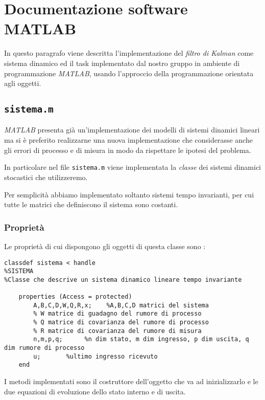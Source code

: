 \section{Documentazione software MATLAB}
In questo paragrafo viene descritta l'implementazione del \textit{filtro di Kalman} come sistema dinamico ed il task implementato dal nostro gruppo in ambiente di programmazione \textit{MATLAB}, usando l'approccio della programmazione orientata agli oggetti.

\subsection{\texttt{sistema.m}}
\textit{MATLAB} presenta già un'implementazione dei modelli di sistemi dinamici lineari ma si è preferito realizzarne una nuova implementazione che considerasse anche gli errori di processo e di misura in modo da rispettare le ipotesi del problema.

In particolare nel file \texttt{sistema.m} viene implementata la \textit{classe} dei sistemi dinamici stocastici che utilizzeremo.

Per semplicità abbiamo implementato soltanto sistemi tempo invarianti, per cui tutte le matrici che definiscono il sistema sono costanti.
\subsubsection{Proprietà}
Le proprietà di cui dispongono gli oggetti di questa classe sono :
\begin{lstlisting}[frame=single]
classdef sistema < handle
%SISTEMA 
%Classe che descrive un sistema dinamico lineare tempo invariante

	properties (Access = protected)
		A,B,C,D,W,Q,R,x;    %A,B,C,D matrici del sistema
		% W matrice di guadagno del rumore di processo
		% Q matrice di covarianza del rumore di processo
		% R matrice di covarianza del rumore di misura
		n,m,p,q;      %n dim stato, m dim ingresso, p dim uscita, q dim rumore di processo
		u;       %ultimo ingresso ricevuto
	end
\end{lstlisting}
I metodi implementati sono il costruttore dell'oggetto che va ad inizializzarlo e le due equazioni di evoluzione dello stato interno e di uscita.\\
\newpage
